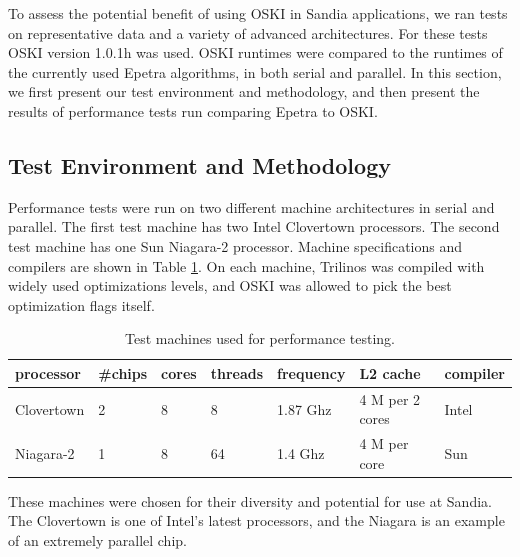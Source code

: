 To assess the potential benefit of using OSKI in Sandia applications, we ran tests on representative
data and a variety of advanced architectures.  For these tests OSKI version 1.0.1h was used.
OSKI runtimes were compared to the runtimes of the currently used Epetra algorithms, in both
serial and parallel.  In this section, we first present our test environment and methodology,
and then present the results of performance tests run comparing Epetra to OSKI.

\subsection{Test Environment and Methodology}

Performance tests were run on two different machine architectures in serial and parallel.
The first test machine has two Intel Clovertown processors.
The second test machine has one Sun Niagara-2 processor.  Machine
specifications and compilers are shown in Table \ref{IK:fig:machines}.  On
each machine,
Trilinos was compiled with widely used optimizations levels,
 and OSKI was allowed to pick the best optimization flags itself.

\begin{table}[htbp]
\begin{center}
\begin{tabular}{|l|l|l|l|l|l|l|}
\hline
processor & \#chips & cores & threads & frequency & L2 cache & compiler \\
\hline
Clovertown & 2 & 8 & 8 & 1.87 Ghz & 4 M per 2 cores & Intel \\
Niagara-2 & 1 & 8 & 64 & 1.4 Ghz & 4 M per core & Sun \\
\hline

\end{tabular}
\caption{Test machines used for performance testing.}
\label{IK:fig:machines}
\end{center}
\end{table}

These machines were chosen for their diversity and potential for use at Sandia.
The Clovertown is one of Intel's latest processors, and the Niagara is an example of an extremely parallel chip.

